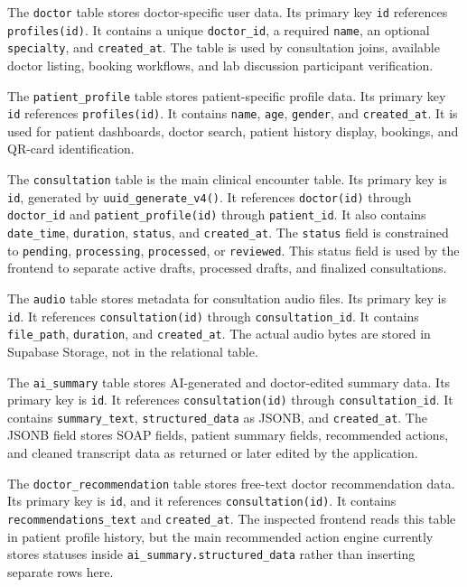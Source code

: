 The \texttt{doctor} table stores doctor-specific user data. Its primary key \texttt{id} references \texttt{profiles(id)}. It contains a unique \texttt{doctor\_id}, a required \texttt{name}, an optional \texttt{specialty}, and \texttt{created\_at}. The table is used by consultation joins, available doctor listing, booking workflows, and lab discussion participant verification.

The \texttt{patient\_profile} table stores patient-specific profile data. Its primary key \texttt{id} references \texttt{profiles(id)}. It contains \texttt{name}, \texttt{age}, \texttt{gender}, and \texttt{created\_at}. It is used for patient dashboards, doctor search, patient history display, bookings, and QR-card identification.

The \texttt{consultation} table is the main clinical encounter table. Its primary key is \texttt{id}, generated by \texttt{uuid\_generate\_v4()}. It references \texttt{doctor(id)} through \texttt{doctor\_id} and \texttt{patient\_profile(id)} through \texttt{patient\_id}. It also contains \texttt{date\_time}, \texttt{duration}, \texttt{status}, and \texttt{created\_at}. The \texttt{status} field is constrained to \texttt{pending}, \texttt{processing}, \texttt{processed}, or \texttt{reviewed}. This status field is used by the frontend to separate active drafts, processed drafts, and finalized consultations.

The \texttt{audio} table stores metadata for consultation audio files. Its primary key is \texttt{id}. It references \texttt{consultation(id)} through \texttt{consultation\_id}. It contains \texttt{file\_path}, \texttt{duration}, and \texttt{created\_at}. The actual audio bytes are stored in Supabase Storage, not in the relational table.

The \texttt{ai\_summary} table stores AI-generated and doctor-edited summary data. Its primary key is \texttt{id}. It references \texttt{consultation(id)} through \texttt{consultation\_id}. It contains \texttt{summary\_text}, \texttt{structured\_data} as JSONB, and \texttt{created\_at}. The JSONB field stores SOAP fields, patient summary fields, recommended actions, and cleaned transcript data as returned or later edited by the application.

The \texttt{doctor\_recommendation} table stores free-text doctor recommendation data. Its primary key is \texttt{id}, and it references \texttt{consultation(id)}. It contains \texttt{recommendations\_text} and \texttt{created\_at}. The inspected frontend reads this table in patient profile history, but the main recommended action engine currently stores statuses inside \texttt{ai\_summary.structured\_data} rather than inserting separate rows here.

